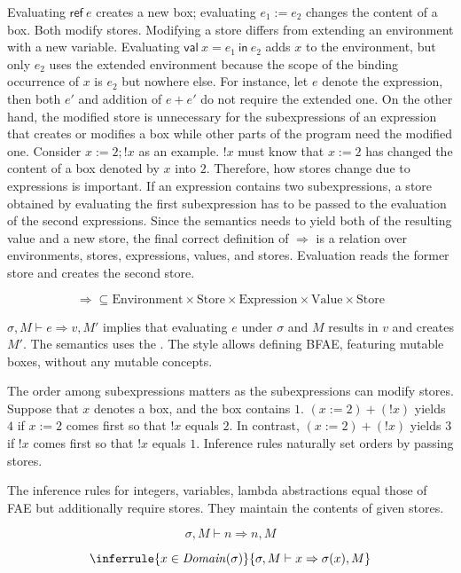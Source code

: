 Evaluating \(\textsf{ref}\ e\) creates a new box; evaluating \(e_1:=e_2\) changes
the content of a box. Both modify stores. Modifying a store differs from
extending an environment with a new variable. Evaluating \(\textsf{val}\ x=e_1\
\textsf{in}\ e_2\) adds \(x\) to the environment, but only \(e_2\) uses the
extended environment because the scope of the binding occurrence of \(x\) is
\(e_2\) but nowhere else. For instance, let \(e\) denote the expression, then
both \(e'\) and addition of \(e+e'\) do not require the extended one. On the
other hand, the modified store is unnecessary for the subexpressions of an
expression that creates or modifies a box while other parts of the program need
the modified one. Consider \(x:=2;!x\) as an example. \(!x\) must know that
\(x:=2\) has changed the content of a box denoted by \(x\) into \(2\). Therefore,
how stores change due to expressions is important. If an expression contains two
subexpressions, a store obtained by evaluating the first subexpression has to be
passed to the evaluation of the second expressions. Since the semantics needs to
yield both of the resulting value and a new store, the final correct definition
of \(\Rightarrow\) is a relation over environments, stores, expressions, values,
and stores. Evaluation reads the former store and creates the second store.


\[\Rightarrow\subseteq\text{Environment}\times\text{Store}\times\text{Expression}\times\text{Value}\times\text{Store}\]

\(\sigma,M\vdash e\Rightarrow v,M'\) implies that evaluating \(e\) under
\(\sigma\) and \(M\) results in \(v\) and creates \(M'\). The semantics uses the
\term{store passing style}. The style allows defining BFAE, featuring mutable
boxes, without any mutable concepts.

The order among subexpressions matters as the subexpressions can modify stores.
Suppose that \(x\) denotes a box, and the box contains \(1\). \( (x:=2)+(!x) \)
yields \(4\) if \(x:=2\) comes first so that \(!x\) equals \(2\). In contrast, \(
(x:=2)+(!x) \) yields \(3\) if \(!x\) comes first so that \(!x\) equals \(1\).
Inference rules naturally set orders by passing stores.

The inference rules for integers, variables, lambda abstractions equal those of
FAE but additionally require stores. They maintain the contents of given stores.

\[
\sigma,M\vdash n\Rightarrow n,M
\]

\[
\inferrule
{ x\in\mathit{Domain}(\sigma) }
{ \sigma,M\vdash x\Rightarrow \sigma(x),M }
\]


